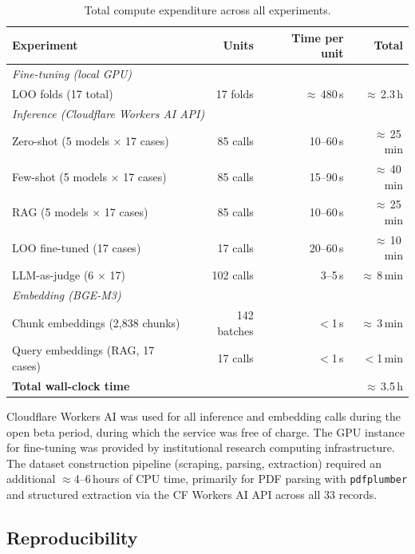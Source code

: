 \documentclass[preprint,12pt]{elsarticle}
\begin{document}
\begin{table}[h]
\centering
\caption{Total compute expenditure across all experiments.}
\label{tab:compute}
\begin{tabular}{lrrr}
\toprule
Experiment & Units & Time per unit & Total \\
\midrule
\multicolumn{4}{l}{\textit{Fine-tuning (local GPU)}} \\
LOO folds (17 total)     & 17 folds & $\approx$\,480\,s & $\approx$\,2.3\,h \\
\midrule
\multicolumn{4}{l}{\textit{Inference (Cloudflare Workers AI API)}} \\
Zero-shot (5 models × 17 cases)  & 85 calls  & 10--60\,s & $\approx$\,25\,min \\
Few-shot  (5 models × 17 cases)  & 85 calls  & 15--90\,s & $\approx$\,40\,min \\
RAG       (5 models × 17 cases)  & 85 calls  & 10--60\,s & $\approx$\,25\,min \\
LOO fine-tuned (17 cases)         & 17 calls  & 20--60\,s & $\approx$\,10\,min \\
LLM-as-judge (6 × 17)            & 102 calls & 3--5\,s   & $\approx$\,8\,min \\
\midrule
\multicolumn{4}{l}{\textit{Embedding (BGE-M3)}} \\
Chunk embeddings (2,838 chunks)  & 142 batches & $<$1\,s  & $\approx$\,3\,min \\
Query embeddings (RAG, 17 cases) & 17 calls    & $<$1\,s  & $<$1\,min \\
\midrule
\textbf{Total wall-clock time}   &  &  & $\approx$\,3.5\,h \\
\bottomrule
\end{tabular}
\end{table}

Cloudflare Workers AI was used for all inference and embedding calls during
the open beta period, during which the service was free of charge.
The GPU instance for fine-tuning was provided by institutional research
computing infrastructure.
The dataset construction pipeline (scraping, parsing, extraction) required
an additional $\approx$4--6\,hours of CPU time, primarily for PDF parsing
with \texttt{pdfplumber} and structured extraction via the CF Workers AI API
across all 33 records.

\subsection{Reproducibility}
\end{document}
